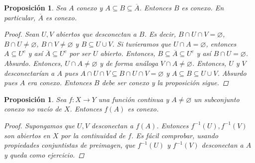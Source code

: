 \documentclass[12pt]{book}
\newtheorem{prop}[teo]{Proposición}
\theoremstyle{definition}
\let\emptyset\varnothing
\begin{document}
\begin{prop}
Sea $A$ conexo y $A\subseteq B\subseteq \overline{A}$. Entonces $B$ es conexo. En particular, $\overline{A}$ es conexo.
\begin{proof}
Sean $U,V$ abiertos que desconectan a $B$. Es decir, $B\cap U\cap V = \emptyset$, $B\cap U\neq\emptyset$, $B\cap V\neq \emptyset$ y $B\subseteq U\cup V$. Si tuvieramos que $U\cap A=\emptyset$, entonces $A\subseteq U^c$ y así $\overline{A}\subseteq U^c$ por ser $U$ abierto. Entonces, $B\subseteq \overline{A}\subseteq U^c$ y así $B\cap U = \emptyset$. Absurdo. Entonces, $U\cap A\neq \emptyset$ y de forma análoga $V\cap A\neq\emptyset$. Entonces, $U$ y $V$ desconectarían a $A$ pues $A\cap U\cap V\subseteq B\cap U\cap V = \emptyset$ y $A\subseteq B\subseteq U\cup V$. Absurdo pues $A$ era conexo. Entonces $B$ debe ser conexo y la proposición sigue.
\end{proof}
\end{prop}

\begin{prop}
Sea $f:X\to Y$ una función continua y $A\neq\emptyset$ un subconjunto conexo no vacío de $X$. Entonces $f(A)$ es conexo.
\begin{proof}
Supongamos que $U,V$ desconectan a $f(A)$. Entonces $f^{-1}(U), f^{-1}(V)$ son abiertos en $X$ por la continuidad de $f$. Es fácil comprobar, usando propiedades conjuntistas de preimagen, que $f^{-1}(U)$ y $f^{-1}(V)$ desconectan a $A$ y queda como ejercicio.
\end{proof}
\end{prop}
\end{document}
